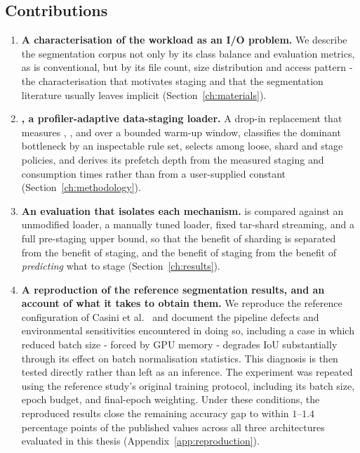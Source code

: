 \subsection{Contributions}

\begin{enumerate}
  \item \textbf{A characterisation of the workload as an I/O problem.}
    We describe the segmentation corpus not only by its class balance and evaluation
    metrics, as is conventional, but by its file count, size distribution and access
    pattern - the characterisation that motivates staging and that the segmentation
    literature usually leaves implicit (Section~\ref{ch:materials}).

  \item \textbf{\pads{}, a profiler-adaptive data-staging loader.}
    A drop-in  replacement that measures \Tdata{}, \Tdecode{},
    \Thtod{} and \Tgpu{} over a bounded warm-up window, classifies the dominant
    bottleneck by an inspectable rule set, selects among loose, shard and stage
    policies, and derives its prefetch depth from the measured staging and
    consumption times rather than from a user-supplied constant
    (Section~\ref{ch:methodology}).

  \item \textbf{An evaluation that isolates each mechanism.}
    \pads{} is compared against an unmodified loader, a manually tuned loader,
    fixed tar-shard streaming, and a full pre-staging upper bound, so that the
    benefit of sharding is separated from the benefit of staging, and the benefit
    of staging from the benefit of \emph{predicting} what to stage
    (Section~\ref{ch:results}).

  \item \textbf{A reproduction of the reference segmentation results, and an account
    of what it takes to obtain them.}
    We reproduce the reference configuration of Casini et al.~\cite{Casini23} and
    document the pipeline defects and environmental sensitivities encountered in
    doing so, including a case in which reduced batch size - forced by GPU
    memory - degrades IoU substantially through its effect on batch normalisation
    statistics. This diagnosis is then tested directly rather than left as an inference. The experiment was repeated using the reference study's original training protocol, including its batch size, epoch budget, and final-epoch weighting. Under these conditions, the reproduced results close the remaining accuracy gap to within $1$--$1.4$ percentage points of the published values across all three architectures evaluated in this thesis (Appendix~\ref{app:reproduction}).

\end{enumerate}

